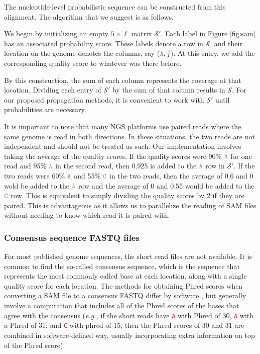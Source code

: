 \documentclass[
]{article}
\newcommand{\eg}{\textit{e.g.,}\xspace}
\newcommand{\sq}[1]{\texttt{\textcolor{brown}{#1}}}
\newcommand{\nps}{\mathcal{S}} %
\begin{document}
The nucleotide-level probabilistic sequence can be constructed from this
alignment. The algorithm that we suggest is as follows.

We begin by initializing an empty \(5\times\ell\) matrix \(\nps'\). Each
label in Figure \ref{fig:sam} has an associated probability score. These
labels denote a row in \(\nps\), and their location on the genome
denotes the columns, say (\(\sq{A}, j\)). At this entry, we add the
corresponding quality score to whatever was there before.

By this construction, the sum of each column represents the coverage at
that location. Dividing each entry of \(\nps'\) by the sum of that
column results in \(\nps\). For our proposed propagation methods, it is
convenient to work with \(\nps'\) until probabilities are necessary.

It is important to note that many NGS platforms use paired reads where
the same genome is read in both directions. In these situations, the two
reads are not independent and should not be treated as such. Our
implementation involves taking the average of the qualtiy scores. If the
quality scores were 90\% \(\sq{A}\) for one read and 95\% \(\sq{A}\) in
the second read, then 0.925 is added to the \(\sq{A}\) row in \(\nps'\).
If the two reads were 60\% \(\sq{A}\) and 55\% \(\sq{C}\) in the two
reads, then the average of 0.6 and 0 wold be added to the \(\sq{A}\) row
and the average of 0 and 0.55 would be added to the \(\sq{C}\) row. This
is equivalent to simply dividing the quality scores by 2 if they are
paired. This is advantageous as it allows us to parallelize the reading
of SAM files without needing to know which read it is paired with.

\hypertarget{consensus-sequence-fastq-files}{%
\subsubsection{Consensus sequence FASTQ
files}\label{consensus-sequence-fastq-files}}

For most published genome sequences, the short read files are not
available. It is common to find the so-called consensus sequence, which
is the sequence that represents the most commonly called base at each
location, along with a single quality score for each location. The
methods for obtaining Phred scores when converting a SAM file to a
consensus FASTQ differ by software
\citep[\citet{keithSimulatedAnnealingAlgorithm2002},
\citet{liMappingShortDNA2008}]{liAdjustQualityScores2004}, but generally
involve a computation that includes all of the Phred scores of the bases
that agree with the consensus (\eg if the short reads have \sq{A} with
Phred of 30, \sq{A} with a Phred of 31, and \sq{C} with phred of 15,
then the Phred scores of 30 and 31 are combined in software-defined way,
usually incorporating extra information on top of the Phred score).
\end{document}
